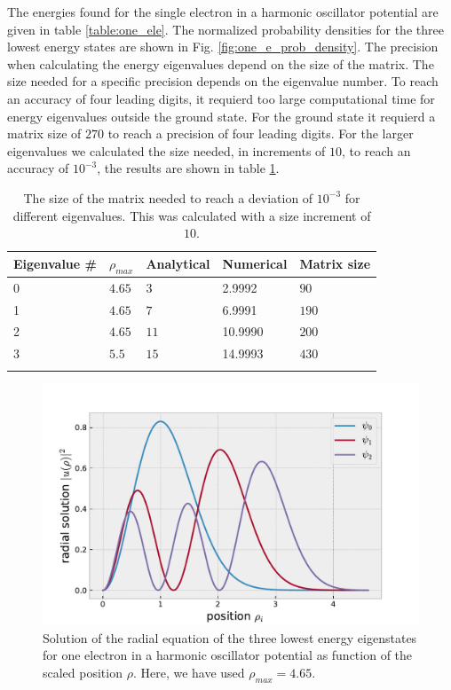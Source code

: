 \documentclass[%
 reprint,
nofootinbib,
aps,
]{revtex4-1}
\begin{document}
The energies found for the single electron in a harmonic oscillator potential are given in table \ref{table:one_ele}. The normalized probability densities for the three lowest energy states are shown in Fig. \vref{fig:one_e_prob_density}.
The precision when calculating the energy eigenvalues depend on the size of the matrix. The size needed for a specific precision depends on the eigenvalue number. To reach an accuracy of four leading digits, it requierd too large computational time for energy eigenvalues outside the ground state. For the ground state it requierd a matrix size of $270$ to reach a precision of four leading digits. For the larger eigenvalues we calculated the size needed, in increments of $10$, to reach an accuracy of $10^{-3}$, the results are shown in table \ref{table:accuracy}.

\begin{table}[]
\caption{The size of the matrix needed to reach a deviation of $10^{-3}$ for different eigenvalues. This was calculated with a size increment of $10$.}
\begin{tabular}{@{}lllll@{}}
\toprule
Eigenvalue \# &  $\rho_{max}$ & Analytical & Numerical & Matrix size\\ \midrule
0     & $4.65$ & $3$       &  2.9992   &  $90$     \\
1     & $4.65$ & $7$       &  6.9991   &  $190$    \\
2     & $4.65$ & $11$      & 10.9990   &  $200$    \\
3     & $5.5$  & $15$      & 14.9993   &  $430$    \\
\botrule
\end{tabular}
\label{table:accuracy}
\end{table}


\begin{figure}
  \centering
  \includegraphics[scale=0.5]{../figures/wavefunc_one_e.pdf}
  \caption{Solution of the radial equation of the three lowest energy eigenstates for one electron in a harmonic oscillator potential as function of the scaled position $\rho$. Here, we have used $\rho_{max} = 4.65$.}
  \label{fig:one_e_prob_density}
\end{figure}
\end{document}
